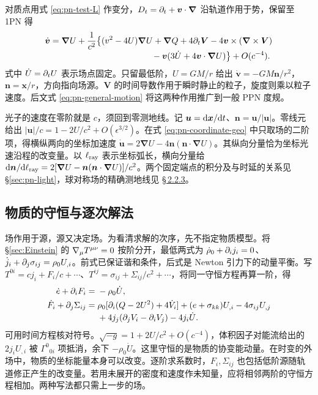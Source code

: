 对质点用式 \eqref{eq:pn-test-L} 作变分，$D_t=\partial_t+\bm v\cdot\bm\nabla$ 沿轨道作用于势，保留至 1PN 得
\begin{align}
 \dot{\bm v}={}&\bm\nabla U+\frac{1}{c^2}\big\{
 (v^2-4U)\bm\nabla U+\bm\nabla Q+4\p_t\bm V
 -4\bm v\times(\bm\nabla\times\bm V)\nonumber\\[-2pt]
 &\hspace{37mm}-\bm v(3\dot U+4\bm v\cdot\bm\nabla U)\big\}+O(c^{-4}).
 \label{eq:pn-test-a}
\end{align}
式中 $\dot U=\partial_tU$ 表示场点固定。只留最低阶，$U=GM/r$ 给出 $\dot{\bm v}=-GM\bm n/r^2$，$\bm n=\bm x/r$，方向指向场源。$\bm V$ 的时间导数作用于瞬时静止的粒子，旋度则乘以粒子速度。后文式 \eqref{eq:pn-general-motion} 将这两种作用推广到一般 PPN 度规。

光子的速度在零阶就是 $c$，须回到零测地线。记 $\bm u=\dd\bm x/\dd t$、$\bm n=\bm u/|\bm u|$。零线元给出 $|\bm u|/c=1-2U/c^2+O(\epsilon^{3/2})$。在式 \eqref{eq:pn-coordinate-geo} 中只取场的二阶项，得横纵两向的坐标加速度 $\dot{\bm u}=2\bm\nabla U-4\bm n(\bm n\cdot\bm\nabla U)$。其纵向分量恰为坐标光速沿程的改变量。以 $\ell_{\rm ray}$ 表示坐标弧长，横向分量给 $\dd\bm n/\dd\ell_{\rm ray}=2[\bm\nabla U-\bm n(\bm n\cdot\bm\nabla U)]/c^2$。两个固定端点的积分及与时延的关系见 \S\ref{sec:pn-light}，球对称场的精确测地线见 \hyperlink{subsection.2.2.3}{\S\,2.2.3}。

\subsection{物质的守恒与逐次解法}\label{sec:pn-matter}

场作用于源，源又决定场。为看清求解的次序，先不指定物质模型。将 \S\ref{sec:Einstein} 的 $\nabla_\mu T^{\mu\nu}=0$ 按阶分开，最低两式为 $\dot\rho_0+\partial_i j_i=0$、$\dot j_i+\partial_j\sigma_{ij}=\rho_0 U_{,i}$。前式已保证谐和条件，后式是 Newton 引力下的动量平衡。写 $T^{0i}=cj_i+F_i/c+\cdots$、$T^{ij}=\sigma_{ij}+\Sigma_{ij}/c^2+\cdots$，将同一守恒方程再算一阶，得
\begin{align}
 \dot e+\partial_iF_i={}&-\rho_0\dot U,\nonumber\\
 \dot F_i+\partial_j\Sigma_{ij}={}&
 \rho_0[\partial_i(Q-2U^2)+4\dot V_i]+(e+\sigma_{kk})U_{,i}
 -4\sigma_{ij}U_{,j}\nonumber\\[-2pt]
 &+4j_j(\partial_jV_i-\partial_iV_j)-4j_i\dot U .\label{eq:pn-matter-balance}
\end{align}
可用时间方程核对符号。$\sqrt{-g}=1+2U/c^2+O(c^{-4})$，体积因子对能流给出的 $2j_iU_{,i}$ 被 $\Gamma^0{}_{0i}$ 项抵消，余下 $-\rho_0\dot U$。这里守恒的是物质的协变能动量。在时变的外场中，物质的坐标能量本身可以改变。逐阶求系数时，$F_i,\Sigma_{ij}$ 也包括低阶源随轨道修正产生的改变量。若用未展开的密度和速度作未知量，应将相邻两阶的守恒方程相加。两种写法都只需上一步的场。

